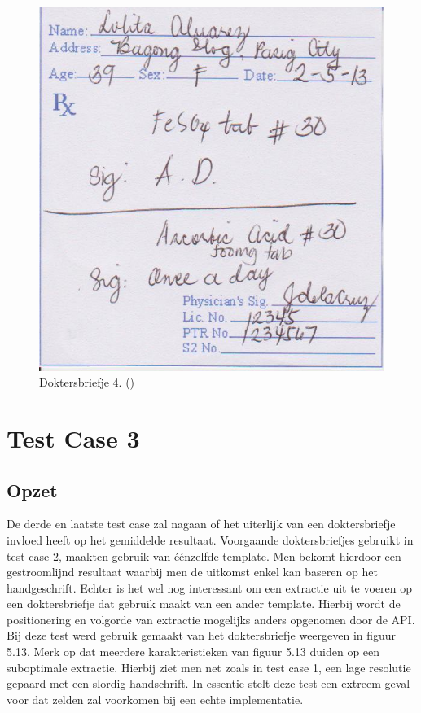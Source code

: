 \clearpage
\begin{figure}
	
	\includegraphics[width=\textwidth,height=\textheight,keepaspectratio]{../doktersbriefjes/dokterbriefje_4.jpg}
	\captionsetup{justification=centering,margin=2cm}
	\caption{Doktersbriefje 4. (\cite{Tacio2013})}
	\centering
\end{figure}
\clearpage

\section{Test Case 3}
\subsection{Opzet}
De derde en laatste test case zal nagaan of het uiterlijk van een doktersbriefje invloed heeft op het gemiddelde resultaat. Voorgaande doktersbriefjes gebruikt in test case 2, maakten gebruik van éénzelfde template. Men bekomt hierdoor een gestroomlijnd resultaat waarbij men de uitkomst enkel kan baseren op het handgeschrift. Echter is het wel nog interessant om een extractie uit te voeren op een doktersbriefje dat gebruik maakt van een ander template. Hierbij wordt de positionering en volgorde van extractie mogelijks anders opgenomen door de API. 
Bij deze test werd gebruik gemaakt van het doktersbriefje weergeven in figuur 5.13. Merk op dat meerdere karakteristieken van figuur 5.13 duiden op een suboptimale extractie. Hierbij ziet men net zoals in test case 1, een lage resolutie gepaard met een slordig handschrift. In essentie stelt deze test een extreem geval voor dat zelden zal voorkomen bij een echte implementatie. 

